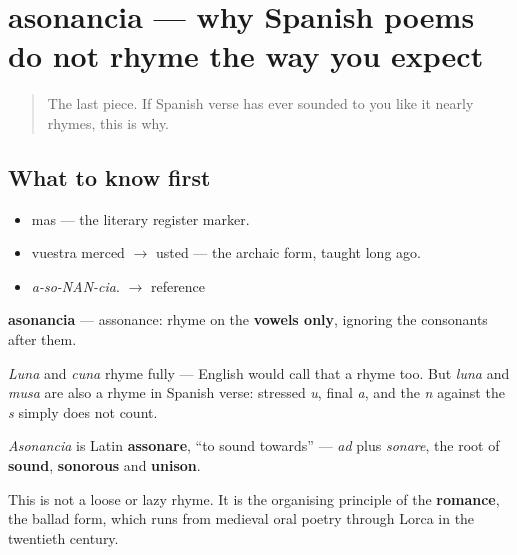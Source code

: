 \section[asonancia]{asonancia — why Spanish poems do not rhyme the way you expect}

\label{lesson:ES-C276-asonancia}



\begin{quote}
The last piece. If Spanish verse has ever sounded to you like it nearly rhymes, this is why.
\end{quote}

\subsection*{What to know first}
\begin{itemize}
\raggedright
  \item mas — the literary register marker.
  \item vuestra merced $\to$ usted — the archaic form, taught long ago.
\end{itemize}

\begin{sounds}
\begin{itemize}
\raggedright
  \item \emph{a-so-NAN-cia}. $\to$ reference
\end{itemize}
\end{sounds}

\begin{cousinweb}
\textbf{asonancia} — assonance: rhyme on the \textbf{vowels only}, ignoring the consonants after them.

\emph{Luna} and \emph{cuna} rhyme fully — English would call that a rhyme too. But \emph{luna} and \emph{musa} are also a rhyme in Spanish verse: stressed \emph{u}, final \emph{a}, and the \emph{n} against the \emph{s} simply does not count.

\emph{Asonancia} is Latin \textbf{assonare}, \textquotedblleft{}to sound towards\textquotedblright{} — \emph{ad} plus \emph{sonare}, the root of \textbf{sound}, \textbf{sonorous} and \textbf{unison}.

This is not a loose or lazy rhyme. It is the organising principle of the \textbf{romance}, the ballad form, which runs from medieval oral poetry through Lorca in the twentieth century.
\end{cousinweb}

